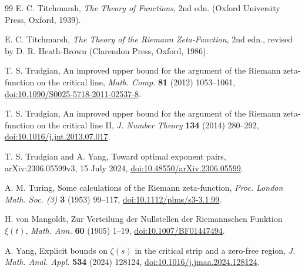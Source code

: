 \documentclass[11pt,reqno]{amsart}
\numberwithin{equation}{section}
\theoremstyle{definition}
\theoremstyle{remark}
\begin{document}
\begin{thebibliography}{99}
 E. C. Titchmarsh, \textit{The Theory of Functions}, 2nd edn. (Oxford University Press, Oxford, 1939).

 E. C. Titchmarsh, \textit{The Theory of the Riemann Zeta-Function}, 2nd edn., revised by D. R. Heath-Brown (Clarendon Press, Oxford, 1986).

 T. S. Trudgian, An improved upper bound for the argument of the Riemann zeta-function on the critical line, \textit{Math. Comp.} \textbf{81} (2012) 1053--1061, \href{https://doi.org/10.1090/S0025-5718-2011-02537-8}{doi:10.1090/S0025-5718-2011-02537-8}.

 T. S. Trudgian, An improved upper bound for the argument of the Riemann zeta-function on the critical line II, \textit{J. Number Theory} \textbf{134} (2014) 280--292, \href{https://doi.org/10.1016/j.jnt.2013.07.017}{doi:10.1016/j.jnt.2013.07.017}.

 T. S. Trudgian and A. Yang, Toward optimal exponent pairs, arXiv:2306.05599v3, 15 July 2024, \href{https://doi.org/10.48550/arXiv.2306.05599}{doi:10.48550/arXiv.2306.05599}.

 A. M. Turing, Some calculations of the Riemann zeta-function, \textit{Proc. London Math. Soc. (3)} \textbf{3} (1953) 99--117, \href{https://doi.org/10.1112/plms/s3-3.1.99}{doi:10.1112/plms/s3-3.1.99}.

 H. von Mangoldt, Zur Verteilung der Nullstellen der Riemannschen Funktion $\xi(t)$, \textit{Math. Ann.} \textbf{60} (1905) 1--19, \href{https://doi.org/10.1007/BF01447494}{doi:10.1007/BF01447494}.

 A. Yang, Explicit bounds on $\zeta(s)$ in the critical strip and a zero-free region, \textit{J. Math. Anal. Appl.} \textbf{534} (2024) 128124, \href{https://doi.org/10.1016/j.jmaa.2024.128124}{doi:10.1016/j.jmaa.2024.128124}.

\end{thebibliography}

\appendix
\end{document}
